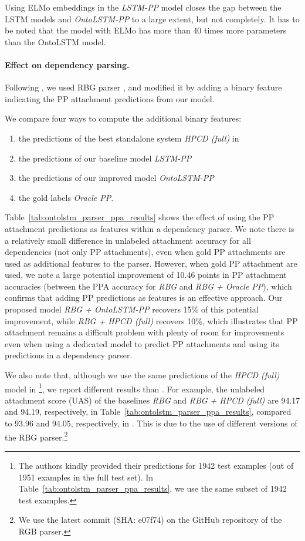 Using ELMo embeddings in the \textit{LSTM-PP} model closes the gap between the
LSTM models and \textit{OntoLSTM-PP} to a large extent, but not completely.
It has to be noted that the model with ELMo has more than $40$ times more
parameters than the OntoLSTM model.

\paragraph{Effect on dependency parsing.} Following
\cite{belinkov2014exploring}, we used RBG parser \citep{lei2014low}, and
modified it by adding a binary feature indicating the PP attachment predictions
from our model. 

We compare four ways to compute the additional binary features:
\begin{enumerate} \item the predictions of the best standalone system
		\textit{HPCD (full)} in \cite{belinkov2014exploring} \item the
			predictions of our baseline model \textit{LSTM-PP} \item
the predictions of our improved model \textit{OntoLSTM-PP} \item the gold labels
\textit{Oracle PP}.  \end{enumerate}

Table~\ref{tab:ontolstm_parser_ppa_results} shows the effect of using the PP
attachment predictions as features within a dependency parser.  We note there is
a relatively small difference in unlabeled attachment accuracy for all
dependencies (not only PP attachments), even when gold PP attachments are used
as additional features to the parser.  However, when gold PP attachment are
used, we note a large potential improvement of 10.46 points in PP attachment
accuracies (between the PPA accuracy for \textit{RBG} and \textit{RBG + Oracle
PP}), which confirms that adding PP predictions as features is an effective
approach.  Our proposed model \textit{RBG + OntoLSTM-PP} recovers 15\% of this
potential improvement, while \textit{RBG + HPCD (full)} recovers 10\%, which
illustrates that PP attachment remains a difficult problem with plenty of room
for improvements even when using a dedicated model to predict PP attachments and
using its predictions in a dependency parser.

We also note that, although we use the same predictions of the \textit{HPCD
(full)} model in  \cite{belinkov2014exploring}\footnote{The authors kindly
provided their predictions for 1942 test examples (out of 1951 examples in the
full test set). In Table~\ref{tab:ontolstm_parser_ppa_results}, we use the same
subset of 1942 test examples.}, we report different results than
\cite{belinkov2014exploring}.  For example, the unlabeled attachment score (UAS)
of the baselines \textit{RBG} and \textit{RBG + HPCD (full)} are 94.17 and
94.19, respectively, in Table~\ref{tab:ontolstm_parser_ppa_results}, compared to
93.96 and 94.05, respectively, in \cite{belinkov2014exploring}.  This is due to
the use of different versions of the RBG parser.\footnote{We use the latest
commit (SHA: e07f74) on the GitHub repository of the RGB parser.}

